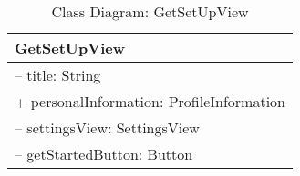 \begin{table}[ht]
\centering
\caption{Class Diagram: GetSetUpView}

\hspace{1em}
\renewcommand{\arraystretch}{1.7}

\begin{tabular}{|l|}
\hline
\textbf{GetSetUpView} \\
\hline
– title: String \\
+ personalInformation: ProfileInformation \\
– settingsView: SettingsView \\
– getStartedButton: Button \\
\hline
\end{tabular}
\end{table}
